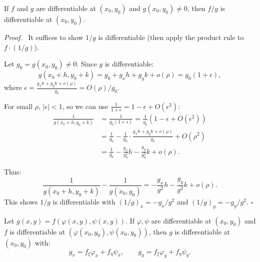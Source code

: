 \documentclass[11pt]{report}
\renewenvironment{proof}[1][Proof]{\par\noindent\textit{#1.}\ }{\hfill$\square$\par\medskip}
\begin{document}
\begin{theorem}
If $f$ and $g$ are differentiable at $(x_0, y_0)$ and $g(x_0, y_0) \neq 0$, then $f/g$ is differentiable at $(x_0, y_0)$.
\end{theorem}

\begin{proof}
It suffices to show $1/g$ is differentiable (then apply the product rule to $f \cdot (1/g)$).

Let $g_0 = g(x_0, y_0) \neq 0$. Since $g$ is differentiable:
\[
g(x_0 + h, y_0 + k) = g_0 + g_x h + g_y k + o(\rho) = g_0(1 + \epsilon),
\]
where $\epsilon = \frac{g_x h + g_y k + o(\rho)}{g_0} = O(\rho)/g_0$.

For small $\rho$, $|\epsilon| < 1$, so we can use $\frac{1}{1 + \epsilon} = 1 - \epsilon + O(\epsilon^2)$:
\begin{align*}
\frac{1}{g(x_0 + h, y_0 + k)} &= \frac{1}{g_0(1 + \epsilon)} = \frac{1}{g_0}(1 - \epsilon + O(\epsilon^2)) \\
&= \frac{1}{g_0} - \frac{1}{g_0} \cdot \frac{g_x h + g_y k + o(\rho)}{g_0} + O(\rho^2) \\
&= \frac{1}{g_0} - \frac{g_x}{g_0^2} h - \frac{g_y}{g_0^2} k + o(\rho).
\end{align*}

Thus:
\[
\frac{1}{g(x_0 + h, y_0 + k)} - \frac{1}{g(x_0, y_0)} = -\frac{g_x}{g^2} h - \frac{g_y}{g^2} k + o(\rho).
\]
This shows $1/g$ is differentiable with $(1/g)_x = -g_x/g^2$ and $(1/g)_y = -g_y/g^2$.
\end{proof}

\begin{theorem}
Let $g(x,y) = f(\varphi(x,y), \psi(x,y))$. If $\varphi, \psi$ are differentiable at $(x_0, y_0)$ and $f$ is differentiable at $(\varphi(x_0, y_0), \psi(x_0, y_0))$, then $g$ is differentiable at $(x_0, y_0)$ with:
\[
g_x = f_\xi \varphi_x + f_\eta \psi_x, \qquad g_y = f_\xi \varphi_y + f_\eta \psi_y.
\]
\end{theorem}
\end{document}
